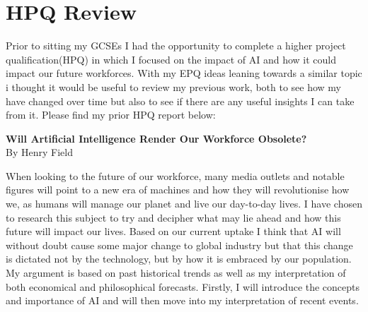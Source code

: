 \section{HPQ Review}
\label{research:ReviewHPQ}
Prior to sitting my GCSEs I had the opportunity to complete a higher project qualification(HPQ) in which I focused on the impact of AI and how it could impact our future workforces. With my EPQ ideas leaning towards a similar topic i thought it would be useful to review my previous work, both to see how my have changed over time but also to see if there are any useful insights I can take from it. Please find my prior HPQ report below:
\\
\begin{center}
    \textbf{Will Artificial Intelligence Render Our Workforce Obsolete?}\\
    By Henry Field \autocite{fieldWillArtificialIntelligence}
\end{center}

\sloppy
When looking to the future of our workforce, many media outlets and notable figures will point to a new era of machines and how they will revolutionise how we, as humans will manage our planet and live our day-to-day lives. I have chosen to research this subject to try and decipher what may lie ahead and how this future will impact our lives. Based on our current uptake I think that AI will without doubt cause some major change to global industry but that this change is dictated not by the technology, but by how it is embraced by our population. My argument is based on past historical trends as well as my interpretation of both economical and philosophical forecasts. Firstly, I will introduce the concepts and importance of AI and will then move into my interpretation of recent events.

